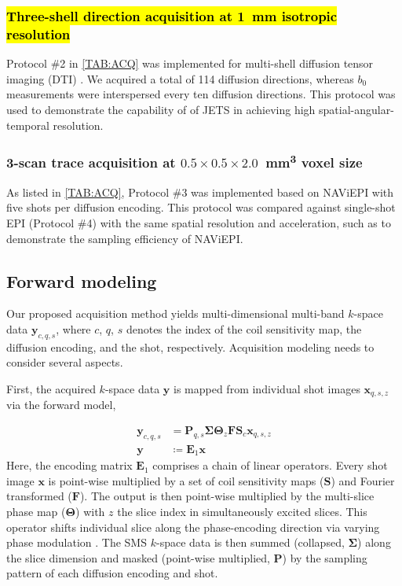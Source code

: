 \documentclass[preprint,12pt,authoryear,review]{elsarticle}
\begin{document}
    \subsubsection{\hl{Three-shell direction acquisition
    at \mbox{\SI{1}{\milli\meter}} isotropic resolution}}

    Protocol \#2 in \cref{TAB:ACQ} was implemented
    for multi-shell diffusion tensor imaging (DTI)
    \citep{basser_1994_dmri}.
    We acquired a total of 114 diffusion directions,
    whereas $b_0$ measurements were interspersed
    every ten diffusion directions.
    This protocol was used to demonstrate
    the capability of of JETS in achieving high
    spatial-angular-temporal resolution.


    \subsubsection{3-scan trace acquisition at $0.5\times0.5\times2.0$~\si{\cubic\milli\meter} voxel size}

    As listed in \cref{TAB:ACQ},
    Protocol \#3 was implemented based on
    NAViEPI with five shots per diffusion encoding.
    This protocol was compared against single-shot EPI (Protocol \#4)
    with the same spatial resolution and acceleration,
    such as to demonstrate the sampling efficiency of NAViEPI.


    \subsection{Forward modeling}
    Our proposed acquisition method yields
    multi-dimensional multi-band
    $k$-space data $\mathbf{y}_{c,q,s}$,
    where $c$, $q$, $s$ denotes the index of the coil sensitivity map,
    the diffusion encoding, and the shot, respectively.
    Acquisition modeling needs to consider several aspects.

    First, the acquired $k$-space data $\mathbf{y}$ is mapped from
    individual shot images $\mathbf{x}_{q,s,z}$ via the forward model,

    \begin{align}
        \mathbf{y}_{c,q,s} &= \mathbf{P}_{q,s} \mathbf{\Sigma} \mathbf{\Theta}_{z} \mathbf{F} \mathbf{S}_c \mathbf{x}_{q,s,z} \nonumber \\
        \mathbf{y} &\coloneqq \mathbf{E}_1 \mathbf{x} \label{EQU:model_shot}
    \end{align}
    Here, the encoding matrix $\mathbf{E}_1$ comprises
    a chain of linear operators.
    Every shot image $\mathbf{x}$ is point-wise multiplied
    by a set of coil sensitivity maps ($\mathbf{S}$) and Fourier transformed ($\mathbf{F}$).
    The output is then point-wise multiplied by the multi-slice phase map ($\mathbf{\Theta}$)
    with $z$ the slice index in simultaneously excited slices.
    This operator shifts individual slice
    along the phase-encoding direction
    via varying phase modulation \citep{breuer_2005_caipi}.
    The SMS $k$-space data is then
    summed (collapsed, $\mathbf{\Sigma}$) along the slice dimension and
    masked (point-wise multiplied, $\mathbf{P}$) by
    the sampling pattern of each diffusion encoding and shot.
\end{document}
